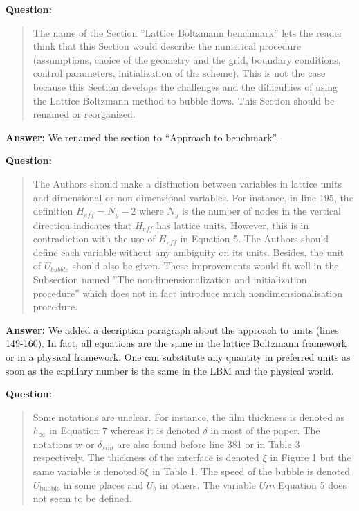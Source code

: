 \documentclass{article}
\begin{document}
\textbf{Question:}
\begin{quotation}
The name of the Section ”Lattice Boltzmann benchmark” lets the reader think that this Section
would describe the numerical procedure (assumptions, choice of the geometry and the grid, boundary
conditions, control parameters, initialization of the scheme). This is not the case because this
Section
develops the challenges and the difficulties of using the Lattice Boltzmann method to bubble ﬂows.
This Section should be renamed or reorganized.
\end{quotation}

\textbf{Answer:} We renamed the section to ``Approach to benchmark''.

\textbf{Question:}
\begin{quotation}
The Authors should make a distinction between variables in lattice units and dimensional or non
dimensional variables. For instance, in line 195, the definition $H_{eff} = N_y - 2$ where $N_y$ is
the
number of nodes in the vertical direction indicates that $H_{eff}$ has lattice units. However, this
is in
contradiction with the use of $H_{eff}$ in Equation 5. The Authors should define each variable
without
any ambiguity on its units. Besides, the unit of $U_{bubble}$ should also be given. These
improvements
would fit well in the Subsection named ”The nondimensionalization and initialization procedure”
which does not in fact introduce much nondimensionalisation procedure.
\end{quotation}

\textbf{Answer:} We added a decription paragraph about the approach to units (lines 149-160). In
fact, all equations are the same in the
lattice Boltzmann framework or in a physical framework. One can substitute any quantity in
preferred units as soon as the capillary number is the same in the LBM and the physical world. 

\textbf{Question:}
\begin{quotation}
Some notations are unclear. For instance, the film thickness is denoted as $h_{\infty}$ in Equation
7 whereas
it is denoted $\delta$ in most of the paper. The notations w or $\delta_{sim}$ are also found before
line 381 or in
Table 3 respectively. The thickness of the interface is denoted $\xi$ in Figure 1 but the same
variable
is
denoted $5\xi$ in Table 1. The speed of the bubble is denoted $U_{\mathrm{bubble}}$ in some places
and $U_b$ in others.
The variable $Uin$ Equation 5 does not seem to be deﬁned.
\end{quotation}
\end{document}

